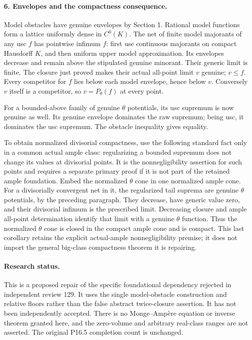 \documentclass[10pt]{article}
\begin{document}
\paragraph{6. Envelopes and the compactness consequence.}
Model obstacles have genuine envelopes by Section 1. Rational model
functions form a lattice uniformly dense in $C^0(K)$. The net of
finite model majorants of any usc $f$ has pointwise infimum $f$:
first use continuous majorants on compact Hausdorff $K$, and then
uniform upper model approximation. Its envelopes decrease and
remain above the stipulated genuine minorant. Their generic limit
is finite. The closure just proved makes their actual all-point
limit $v$ genuine; $v\le f$. Every competitor for $f$ lies below
each model envelope, hence below $v$. Conversely $v$ itself is a
competitor, so $v=P_\theta(f)$ at every point.

For a bounded-above family of genuine $\theta$ potentials, its usc
supremum is now genuine as well. Its genuine envelope dominates
the raw supremum; being usc, it dominates the usc supremum. The
obstacle inequality gives equality.

To obtain normalized divisorial compactness, use the following
standard fact only in a common actual ample class: regularizing a
bounded supremum does not change its values at divisorial points.
It is the nonnegligibility assertion for such points and requires
a separate primary proof if it is not part of the retained ample
foundation. Embed the normalized $\theta$ cone in one normalized
ample cone. For a divisorially convergent net in it, the regularized
tail suprema are genuine $\theta$ potentials, by the preceding
paragraph. They decrease, have generic value zero, and their
divisorial infimum is the prescribed limit. Decreasing closure and
ample all-point determination identify that limit with a genuine
$\theta$ function. Thus the normalized $\theta$ cone is closed in
the compact ample cone and is compact. This last corollary retains
the explicit actual-ample nonnegligibility premise; it does not
import the general big-class compactness theorem it is repairing.

\paragraph{Research status.}
This is a proposed repair of the specific foundational dependency
rejected in independent review 129. It uses the single model-obstacle
construction and relative floors rather than the false abstract
twice-closure assertion. It has not been independently accepted.
There is no Monge--Amp\`ere equation or inverse theorem granted here,
and the zero-volume and arbitrary real-class ranges are not asserted.
The original P16.5 completion count is unchanged.
\end{document}
